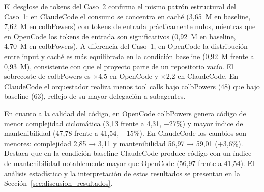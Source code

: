 \documentclass[11pt, letterpaper]{article}
\begin{document}
\begin{table}[H]
\centering
{}
\caption{Caso 2 --- ClaudeCode con Haiku~4.5. Caché = tokens leídos de caché.}
\label{tab:caso2_claudecode}
\end{table}

El desglose de tokens del Caso~2 confirma el mismo patrón estructural del Caso~1: en ClaudeCode el consumo se concentra en caché (3,65~M en baseline, 7,62~M en colbPowers) con tokens de entrada prácticamente nulos, mientras que en OpenCode los tokens de entrada son significativos (0,92~M en baseline, 4,70~M en colbPowers). A diferencia del Caso~1, en OpenCode la distribución entre input y caché es más equilibrada en la condición baseline (0,92~M frente a 0,93~M), consistente con que el proyecto parte de un repositorio vacío. El sobrecoste de colbPowers es $\times$4,5 en OpenCode y $\times$2,2 en ClaudeCode. En ClaudeCode el orquestador realiza menos tool calls bajo colbPowers (48) que bajo baseline (63), reflejo de su mayor delegación a subagentes.

En cuanto a la calidad del código, en OpenCode colbPowers genera código de menor complejidad ciclomática (3,13 frente a 4,31, $-$27\%) y mayor índice de mantenibilidad (47,78 frente a 41,54, $+$15\%). En ClaudeCode los cambios son menores: complejidad 2,85 → 3,11 y mantenibilidad 56,97 → 59,01 ($+$3,6\%). Destaca que en la condición baseline ClaudeCode produce código con un índice de mantenibilidad notablemente mayor que OpenCode (56,97 frente a 41,54). El análisis estadístico y la interpretación de estos resultados se presentan en la Sección~\ref{sec:discusion_resultados}.
\end{document}
